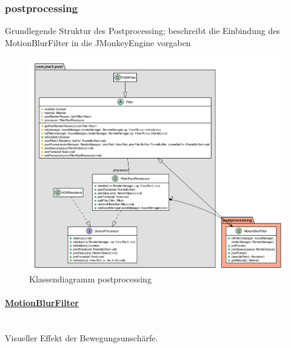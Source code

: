\subsubsection{postprocessing}
        Grundlegende Struktur des Postprocessing; beschreibt die Einbindung des 
        MotionBlurFilter in die JMonkeyEngine vorgaben\par
        \begin{figure}[htbp]
            \centering
            \includegraphics[width=1\linewidth]{InGameGrafik/Bilder/postprocessing.png}
            \caption{Klassendiagramm postprocessing}
        \end{figure}
            \paragraph{\underline{MotionBlurFilter}} \mbox{}\\
                    Visueller Effekt der Bewegungsunschärfe.\par
\pagebreak